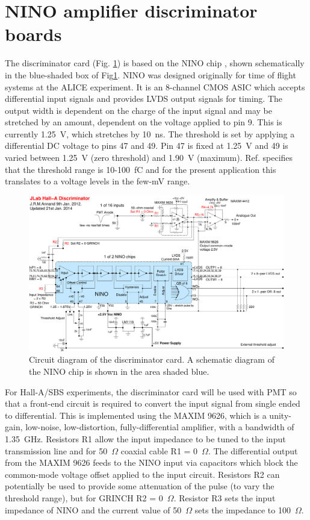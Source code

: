 \documentclass{article}
\begin{document}
\section{NINO amplifier discriminator boards }
The discriminator card (Fig. \ref{fig:nino-schematic}) is based on
the NINO chip \cite{NINO}, shown schematically in the blue-shaded
box of Fig\ref{fig:nino-schematic}. NINO was designed originally
for time of flight systems at the ALICE experiment. It is an 8-channel
CMOS ASIC which accepts differential input signals and provides LVDS
output signals for timing. The output width is dependent on the charge
of the input signal and may be stretched by an amount, dependent on
the voltage applied to pin 9. This is currently 1.25~V, which stretches
by 10~ns. The threshold is set by applying a differential DC voltage
to pins 47 and 49. Pin 47 is fixed at 1.25~V and 49 is varied between
1.25~V (zero threshold) and 1.90~V (maximum). Ref. \cite{NINO}
specifies that the threshold range is 10-100~fC and for the present
application this translates to a voltage levels in the few-mV range.
\begin{figure}[h]
\includegraphics[width=1\columnwidth]{NINO/ReportJan14/CherenkovNINO-4}

\protect\caption{\label{fig:nino-schematic}Circuit diagram of the discriminator card.
A schematic diagram of the NINO chip is shown in the area shaded blue.}


\end{figure}
For Hall-A/SBS experiments, the discriminator card will be used with
PMT so that a front-end circuit is required to convert the input signal
from single ended to differential. This is implemented using the MAXIM
9626, which is a unity-gain, low-noise, low-distortion, fully-differential
amplifier, with a bandwidth of 1.35~GHz. Resistors R1 allow the input
impedance to be tuned to the input transmission line and for 50~$\Omega$
coaxial cable R1 = 0~$\Omega.$ The differential output from the
MAXIM 9626 feeds to the NINO input via capacitors which block the
common-mode voltage offset applied to the input circuit. Resistors
R2 can potentially be used to provide some attenuation of the pulse
(to vary the threshold range), but for GRINCH R2 = 0~$\Omega.$ Resistor
R3 sets the input impedance of NINO and the current value of 50~$\Omega$
sets the impedance to 100~$\Omega.$
\end{document}
